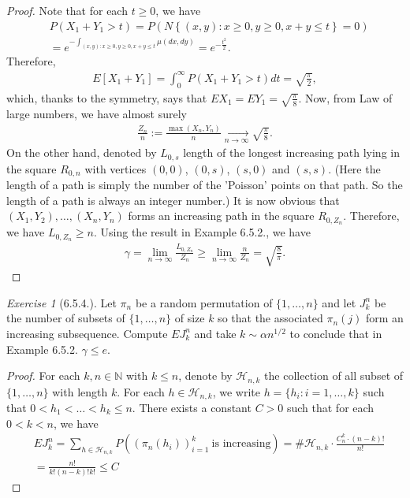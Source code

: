 \documentclass[12pt,a4paper]{amsart}
\theoremstyle{plain}
\theoremstyle{definition}
\theoremstyle{remark}
\newtheorem*{exe}{Exercise}
\numberwithin{equation}{section}
\begin{document}
\begin{proof}
Note that for each $t\geq 0$, we have
\begin{align}
&P(X_1+Y_1 > t) 
= P \left( N\left\{(x,y): x\geq 0, y\geq 0, x+y\leq t \right\} = 0 \right)
\\& = e^{- \int_{(x,y): x\geq 0, y\geq 0, x+y \leq t} \mu(dx,dy)}
= e^{-\frac{t^2}{2}}.
\end{align}
Therefore, 
\begin{align}
E[X_1+Y_1] 
= \int_0^\infty P(X_1 + Y_1 > t) dt 
= \sqrt{\frac{\pi}{2}},
\end{align}
which, thanks to the symmetry, says that $EX_1 = EY_1 = \sqrt{\frac{\pi}{8}}$.
Now, from Law of large numbers, we have almost surely
\begin{align}
\frac{Z_n}{n}:= \frac{\max(X_n,Y_n)}{n} \xrightarrow[n \to \infty]{} \sqrt{\frac{\pi}{8}}. 
\end{align}
On the other hand, denoted by $L_{0,s}$ length of the longest increasing path lying in the square $R_{0,n}$ with vertices $(0,0)$, $(0,s)$, $(s,0)$ and $(s,s)$.
(Here the length of a path is simply the number of the 'Poisson' points on that path. So the length of a path is always an integer number.)  
It is now obvious that $(X_1,Y_2),\dots, (X_n,Y_n)$ forms an increasing path in the square $R_{0, Z_n}$. 
Therefore, we have $L_{0,Z_n} \geq n$.
Using the result in Example 6.5.2., we have
\begin{align}
\gamma 
= \lim_{n\to \infty} \frac{L_{0, Z_n}}{ Z_n}  
\geq \lim_{n\to \infty} \frac{n}{ Z_n}
= \sqrt{\frac{8}{\pi}}.
\end{align}
\end{proof}
\begin{exe}[6.5.4.]
Let $\pi_n$ be a random permutation of $\{1,\dots,n\}$ and let $J_k^n$ be the number of subsets of $\{1,\dots,n\}$ of size $k$ so that the associated $\pi_n(j)$ form an increasing subsequence.
Compute $EJ_k^n$ and take $k\sim \alpha n^{1/2}$ to conclude that in Example 6.5.2. $\gamma \leq e$.
\end{exe}
\begin{proof}
For each $k,n \in \mathbb N$ with $k\leq n$, denote by $\mathcal H_{n,k}$ the collection of all subset of $\{1,\dots, n\}$ with length $k$. For each $h \in \mathcal H_{n,k}$, we write $h = \{h_i: i=1,\dots, k\}$ such that $0< h_1< \dots < h_k\leq n$. 
There exists a constant $C>0$ such that for each $0<k< n$, we have
\begin{align}
&E J_k^n 
= \sum_{h \in \mathcal H_{n,k}} P\left( \left(\pi_n(h_i)\right)_{i=1}^k~\text{is increasing} \right)
= \# \mathcal H_{n,k} \cdot \frac{ C_n^k \cdot (n-k)!}{n!}
\\&= \frac{n!}{k!(n-k)!k!}
\leq C
\end{align}
\end{proof}
\end{document}
